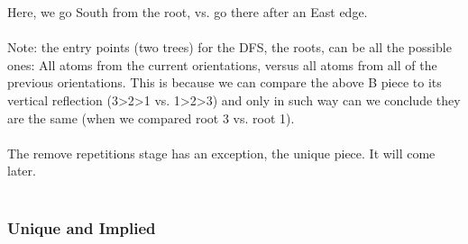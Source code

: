 \documentclass[a4paper,twoside,10pt]{report}
\begin{document}
Here, we go South from the root, vs. go there after an East edge.
\\
\\
Note:  the entry points (two trees) for the DFS, the roots, can be all the possible ones: All atoms from the current orientations, versus all atoms from all of the previous orientations. This is because we can compare the above B piece to its vertical reflection (3>2>1 vs. 1>2>3) and only in such way can we conclude they are the same (when we compared root 3 vs. root 1).
\\
\\
The remove repetitions stage has an exception, the unique piece. It will come later.
\\\\
\subsubsection{Unique and Implied}
\end{document}
